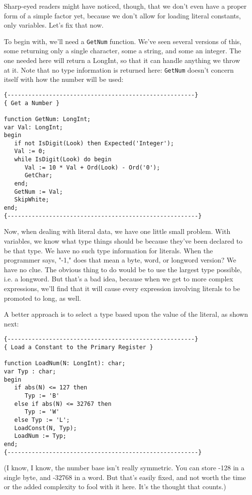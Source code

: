 Sharp-eyed readers might have noticed, though, that we don't even have a proper form of a simple factor yet, because we don't allow for loading literal constants, only  variables. Let's fix that now.

To begin with, we'll need a {\tt GetNum} function. We've  seen several versions of this, some returning  only a single character, some a string, and some an integer. The  one needed here will return a LongInt, so that it can handle anything we  throw  at  it. Note that no type information is returned here: {\tt GetNum} doesn't concern itself with how the number will be used:

\begin{verbatim}
{------------------------------------------------------}
{ Get a Number }

function GetNum: LongInt;
var Val: LongInt;
begin
   if not IsDigit(Look) then Expected('Integer');
   Val := 0;
   while IsDigit(Look) do begin
      Val := 10 * Val + Ord(Look) - Ord('0');
      GetChar;
   end;
   GetNum := Val;
   SkipWhite;
end;
{-------------------------------------------------------}
\end{verbatim}

Now, when dealing with  literal  data, we  have one little small problem. With variables, we know what  type  things  should  be because they've been declared to be  that  type. We have no such type information for  literals. When the programmer says, "-1," does that mean a byte, word, or longword  version?    We  have no clue. The obvious thing to do would be to  use  the largest type possible, i.e. a longword. But that's a bad idea, because when we get to more complex expressions, we'll find that it will cause every expression involving literals  to  be  promoted to long, as well.

A better approach is to select a type based upon the value of the literal, as shown next:

\begin{verbatim}
{------------------------------------------------------}
{ Load a Constant to the Primary Register }

function LoadNum(N: LongInt): char;
var Typ : char;
begin
   if abs(N) <= 127 then
      Typ := 'B'
   else if abs(N) <= 32767 then
      Typ := 'W'
   else Typ := 'L';
   LoadConst(N, Typ);
   LoadNum := Typ;
end;
{-------------------------------------------------------}
\end{verbatim}

(I know, I know, the number base isn't really symmetric. You can store -128 in a single byte, and  -32768  in a word. But that's easily fixed, and not  worth  the time or the added complexity to fool with it here. It's the thought that counts.)

